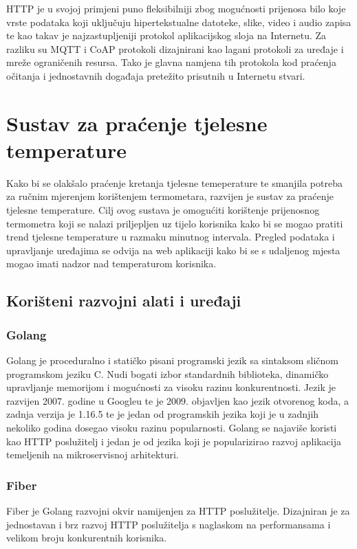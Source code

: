 \documentclass[times, utf8, diplomski]{fer}
\begin{document}
HTTP je u svojoj primjeni puno fleksibilniji zbog mogućnosti prijenosa bilo koje vrste podataka koji uključuju hipertekstualne datoteke, slike, video i audio zapisa te kao takav je najzastupljeniji protokol aplikacijskog sloja na Internetu. Za razliku su MQTT i CoAP protokoli dizajnirani kao lagani protokoli za uređaje i mreže ograničenih resursa. Tako je glavna namjena tih protokola kod praćenja očitanja i jednostavnih događaja pretežito prisutnih u Internetu stvari.

\chapter{Sustav za praćenje tjelesne temperature}
Kako bi se olakšalo praćenje kretanja tjelesne temeperature te smanjila potreba za ručnim mjerenjem korištenjem termometara, razvijen je sustav za praćenje tjelesne temperature. Cilj ovog sustava je omogućiti korištenje prijenosnog termometra koji se nalazi priljepljen uz tijelo korisnika kako bi se mogao pratiti trend tjelesne temperature u razmaku minutnog intervala. Pregled podataka i upravljanje uređajima se odvija na web aplikaciji kako bi se s udaljenog mjesta mogao imati nadzor nad temperaturom korisnika.

\section{Korišteni razvojni alati i uređaji}
\subsection{Golang}
Golang\citep{Golang} je proceduralno i statičko pisani programski jezik sa sintaksom sličnom programskom jeziku C. Nudi bogati izbor standardnih biblioteka, dinamičko upravljanje memorijom i mogućnosti za visoku razinu konkurentnosti. Jezik je razvijen 2007. godine u Googleu te je 2009. objavljen kao jezik otvorenog koda, a zadnja verzija je 1.16.5 te je jedan od programskih jezika koji je u zadnjih nekoliko godina dosegao visoku razinu popularnosti. Golang se najaviše koristi kao HTTP poslužitelj i jedan je od jezika koji je popularizirao razvoj aplikacija temeljenih na mikroservisnoj arhitekturi.

\subsection{Fiber}
Fiber\citep{Fiber} je Golang razvojni okvir namijenjen za HTTP poslužitelje. Dizajniran je za jednostavan i brz razvoj HTTP poslužitelja s naglaskom na performansama i velikom broju konkurentnih korisnika. 
\end{document}
